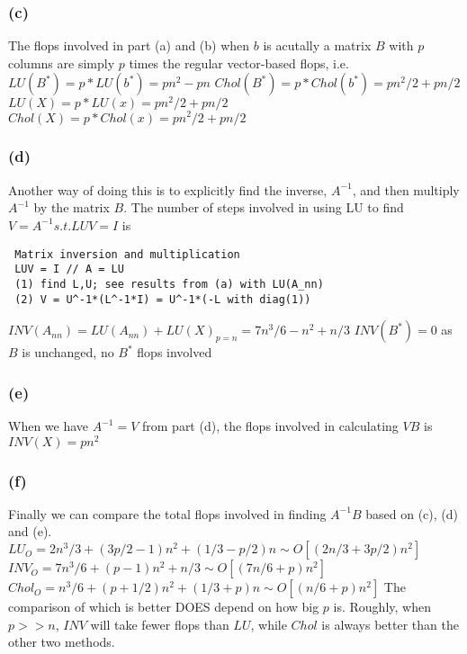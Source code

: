 \documentclass{article}\usepackage{graphicx, color}
\begin{document}
\subsubsection*{(c)}
The flops involved in part (a) and (b) when $b$ is acutally a matrix $B$ with $p$ columns are
simply $p$ times the regular vector-based flops, i.e.
\newline
$LU(B^*)  = p*LU(b^*) = pn^2 - pn$
\newline
$Chol(B^*) = p*Chol(b^*)  = pn^2/2 + pn/2$
\newline
\hbox{}
\newline
$LU(X) = p*LU(x) = pn^2/2 + pn/2$
\newline
$Chol(X) = p*Chol(x) = pn^2/2 + pn/2$

\subsubsection*{(d)}
Another way of doing this is to explicitly find the inverse, $A^{-1}$, and then multiply
$A^{-1}$ by the matrix $B$. The number of steps involved in using LU to find 
$V=A^{-1}  s.t.  LUV = I$ is
\begin{lstlisting}
 Matrix inversion and multiplication
 LUV = I // A = LU
 (1) find L,U; see results from (a) with LU(A_nn)
 (2) V = U^-1*(L^-1*I) = U^-1*(-L with diag(1))
\end{lstlisting}
$INV(A_{nn}) = LU(A_{nn}) + LU(X)_{p=n} = 7n^3/6 - n^2 + n/3$
\newline
$INV(B^*)  = 0 $ \hspace{18 pt} as $B$ is unchanged, no $B^*$ flops involved

\subsubsection*{(e)}
When we have $A^{-1}=V$ from part (d), the flops involved in calculating $VB$ is \newline
$INV(X) = pn^2$

\subsubsection*{(f)}
Finally we can compare the total flops involved in finding $A^{-1}B$ based on (c), (d) and (e).
\newline
$LU_O   = 2n^3/3 + (3p/2-1)n^2 + (1/3-p/2)n \sim O[(2n/3+3p/2)n^2]$
\newline
$INV_O  = 7n^3/6 + (p-1)n^2 + n/3 \sim O[(7n/6+p)n^2]$
\newline
$Chol_O = n^3/6 + (p+1/2)n^2 + (1/3+p)n \sim O[(n/6+p)n^2]$
\newline
\hbox{}
\newline
The comparison of which is better DOES depend on how big $p$ is. Roughly, when $p>>n$, $INV$ will
take fewer flops than $LU$, while $Chol$ is always better than the other two methods.
\end{document}
